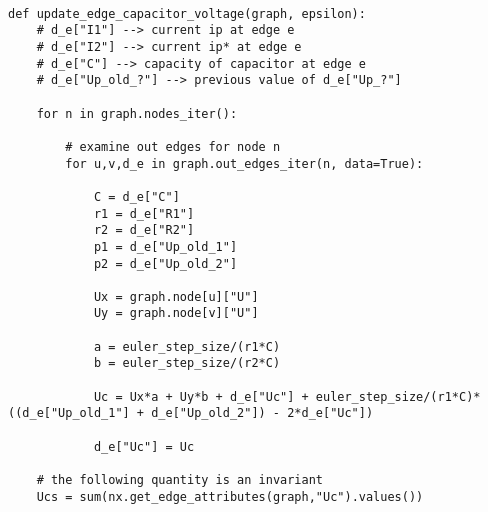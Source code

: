 \begin{codesnippet}
\begin{verbatim}

def update_edge_capacitor_voltage(graph, epsilon):
	# d_e["I1"] --> current ip at edge e
	# d_e["I2"] --> current ip* at edge e
	# d_e["C"] --> capacity of capacitor at edge e
	# d_e["Up_old_?"] --> previous value of d_e["Up_?"]
	
	for n in graph.nodes_iter():

		# examine out edges for node n
		for u,v,d_e in graph.out_edges_iter(n, data=True):

			C = d_e["C"]
			r1 = d_e["R1"]
			r2 = d_e["R2"]
			p1 = d_e["Up_old_1"]
			p2 = d_e["Up_old_2"]
						
			Ux = graph.node[u]["U"]
			Uy = graph.node[v]["U"]

			a = euler_step_size/(r1*C)
			b = euler_step_size/(r2*C)
			
			Uc = Ux*a + Uy*b + d_e["Uc"] + euler_step_size/(r1*C)*((d_e["Up_old_1"] + d_e["Up_old_2"]) - 2*d_e["Uc"]) 

			d_e["Uc"] = Uc

	# the following quantity is an invariant
	Ucs = sum(nx.get_edge_attributes(graph,"Uc").values())		
\end{verbatim}

\label{code:capacitor_voltage}
\end{codesnippet}


